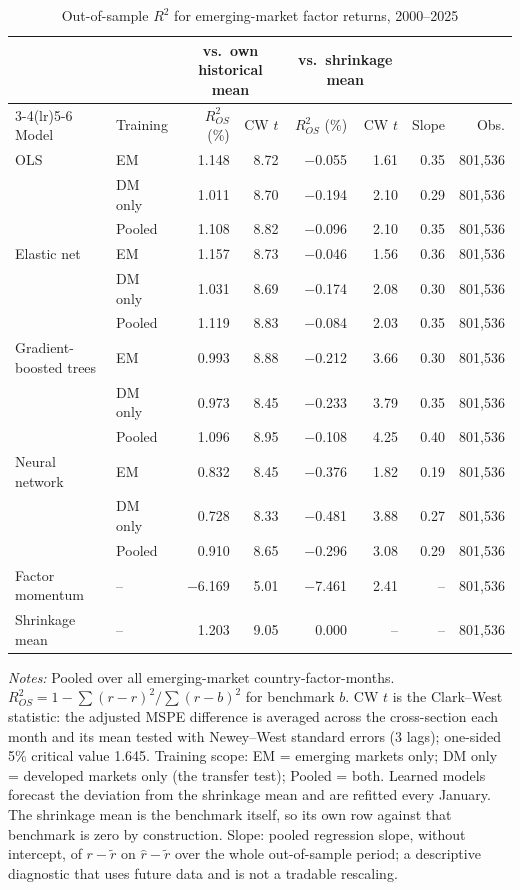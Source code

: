 \begin{table}[!ht]
\centering\small\setlength{\tabcolsep}{4pt}
\caption{Out-of-sample $R^2$ for emerging-market factor returns, 2000--2025}
\label{tab:r2}
\begin{tabular}{llrrrrrr}
\toprule
 & & \multicolumn{2}{c}{vs.\ own historical mean} & \multicolumn{2}{c}{vs.\ shrinkage mean} & & \\
\cmidrule(lr){3-4}\cmidrule(lr){5-6}
Model & Training & $R^2_{OS}$ (\%) & CW $t$ & $R^2_{OS}$ (\%) & CW $t$ & Slope & Obs. \\
\midrule
OLS & EM & 1.148 & 8.72 & $-$0.055 & 1.61 & 0.35 & 801,536 \\
 & DM only & 1.011 & 8.70 & $-$0.194 & 2.10 & 0.29 & 801,536 \\
 & Pooled & 1.108 & 8.82 & $-$0.096 & 2.10 & 0.35 & 801,536 \\
Elastic net & EM & 1.157 & 8.73 & $-$0.046 & 1.56 & 0.36 & 801,536 \\
 & DM only & 1.031 & 8.69 & $-$0.174 & 2.08 & 0.30 & 801,536 \\
 & Pooled & 1.119 & 8.83 & $-$0.084 & 2.03 & 0.35 & 801,536 \\
Gradient-boosted trees & EM & 0.993 & 8.88 & $-$0.212 & 3.66 & 0.30 & 801,536 \\
 & DM only & 0.973 & 8.45 & $-$0.233 & 3.79 & 0.35 & 801,536 \\
 & Pooled & 1.096 & 8.95 & $-$0.108 & 4.25 & 0.40 & 801,536 \\
Neural network & EM & 0.832 & 8.45 & $-$0.376 & 1.82 & 0.19 & 801,536 \\
 & DM only & 0.728 & 8.33 & $-$0.481 & 3.88 & 0.27 & 801,536 \\
 & Pooled & 0.910 & 8.65 & $-$0.296 & 3.08 & 0.29 & 801,536 \\
\addlinespace
Factor momentum & -- & $-$6.169 & 5.01 & $-$7.461 & 2.41 & -- & 801,536 \\
Shrinkage mean & -- & 1.203 & 9.05 & 0.000 & -- & -- & 801,536 \\
\bottomrule
\end{tabular}

\vspace{4pt}
\begin{minipage}{0.95\linewidth}\footnotesize
\textit{Notes:} Pooled over all emerging-market country-factor-months. $R^2_{OS} = 1 - \sum (r-\hat r)^2 / \sum (r-b)^2$ for benchmark $b$. CW $t$ is the Clark--West statistic: the adjusted MSPE difference is averaged across the cross-section each month and its mean tested with Newey--West standard errors (3 lags); one-sided 5\% critical value 1.645. Training scope: EM = emerging markets only; DM only = developed markets only (the transfer test); Pooled = both. Learned models forecast the deviation from the shrinkage mean and are refitted every January. The shrinkage mean is the benchmark itself, so its own row against that benchmark is zero by construction. Slope: pooled regression slope, without intercept, of $r-\tilde r$ on $\hat r-\tilde r$ over the whole out-of-sample period; a descriptive diagnostic that uses future data and is not a tradable rescaling.
\end{minipage}
\end{table}
